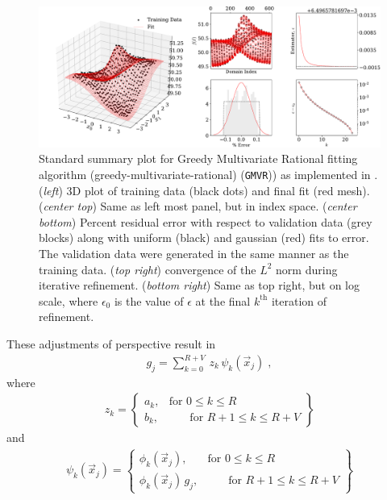 \documentclass[twocolumn,aps,prd,floatfix,preprintnumbers,a4paper,nofootinbib,
superscriptaddress,10pt]{revtex4-1}
\def\gmvr#1{greedy-multivariate-rational#1
  (\texttt{GMVR}#1)\gdef\gmvr{\texttt{GMVR}}}
\begin{document}
\begin{figure}[htb]
  \includegraphics[width=\textwidth]{issue3_summary.pdf}
	\caption{ Standard summary plot for Greedy Multivariate Rational fitting algorithm (\gmvr) as implemented in \cite{lionel_london_2018_1402516}. (\textit{left}) 3D plot of training data (black dots) and final fit (red mesh). (\textit{center top}) Same as left most panel, but in index space. (\textit{center bottom}) {Percent residual error with respect to validation data (grey blocks) along with uniform (black) and gaussian (red) fits to error. The validation data were generated in the same manner as the training data.} (\textit{top right}) convergence of the $L^2$ norm during iterative refinement. (\textit{bottom right}) Same as top right, but on log scale, where $\epsilon_0$ is the value of $\epsilon$ at the final $k^{\mathrm{th}}$ iteration of refinement. }
  \label{fig:gmvrtoy}
\end{figure}
%
These adjustments of perspective result in
%
\begin{align}
  \label{eq:rat3}
  g_j = \sum_{k=0}^{R+V} \, z_{k} \, \psi_k(\vec{x}_j) \;,
\end{align}
%
where
%
\begin{align}
  z_k = \left\{ \begin{array}{cc}
        a_k,      & \text{for }0\leq k\leq R\\
        b_k, & \quad \;\; \;\text{for }R+1\leq k\leq R+V
      \end{array} \right\}
\end{align}
%
and
%
\begin{align}
  \psi_k(\vec{x}_j) = \left\{\begin{array}{cc}
        \phi_k(\vec{x}_j),      & \text{for }0\leq k\leq R\\
        \phi_k(\vec{x}_j)\, g_j , & \quad \;\; \;\text{for }R+1\leq k\leq R+V
        \end{array} \right\}
\end{align}
\end{document}
